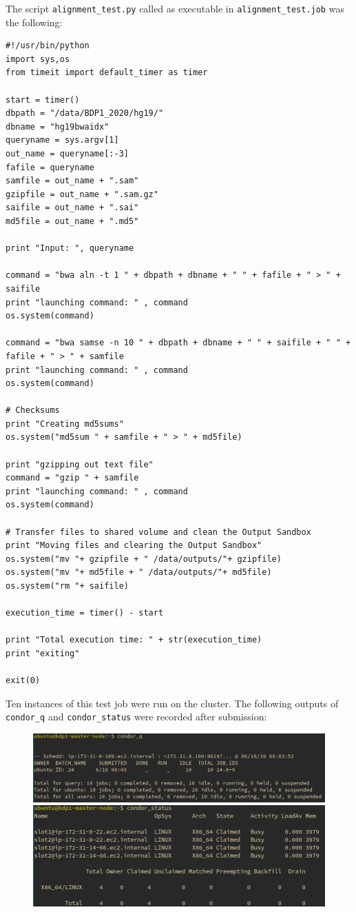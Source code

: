 \documentclass{article}
\begin{document}
The script \texttt{alignment\_test.py} called as executable in \texttt{alignment\_test.job} was the following:

\begin{lstlisting}
#!/usr/bin/python
import sys,os
from timeit import default_timer as timer

start = timer()
dbpath = "/data/BDP1_2020/hg19/"
dbname = "hg19bwaidx"
queryname = sys.argv[1]
out_name = queryname[:-3]
fafile = queryname
samfile = out_name + ".sam"
gzipfile = out_name + ".sam.gz"
saifile = out_name + ".sai"
md5file = out_name + ".md5"

print "Input: ", queryname

command = "bwa aln -t 1 " + dbpath + dbname + " " + fafile + " > " + saifile
print "launching command: " , command
os.system(command)

command = "bwa samse -n 10 " + dbpath + dbname + " " + saifile + " " + fafile + " > " + samfile
print "launching command: " , command
os.system(command)

# Checksums
print "Creating md5sums"
os.system("md5sum " + samfile + " > " + md5file)

print "gzipping out text file"
command = "gzip " + samfile
print "launching command: " , command
os.system(command)

# Transfer files to shared volume and clean the Output Sandbox
print "Moving files and clearing the Output Sandbox"
os.system("mv "+ gzipfile + " /data/outputs/"+ gzipfile)
os.system("mv "+ md5file + " /data/outputs/"+ md5file)
os.system("rm "+ saifile)

execution_time = timer() - start

print "Total execution time: " + str(execution_time)
print "exiting"

exit(0)
\end{lstlisting}

Ten instances of this test job were run on the cluster.
The following outputs of \texttt{condor\_q} and \texttt{condor\_status} were recorded after submission:

\begin{figure}[!h]
    \center
    \includegraphics[width=\textwidth]{./images/condor_q.png}
    \includegraphics[width=\textwidth]{./images/condor_status_busy.png}
\end{figure}
\FloatBarrier
\end{document}
